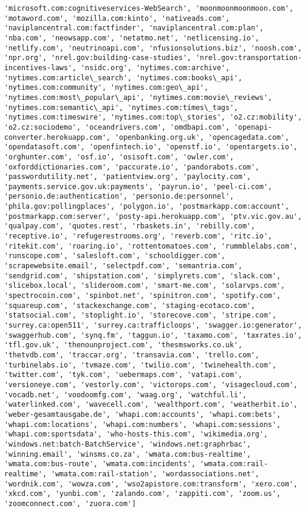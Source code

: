 \documentclass[11pt]{article}
\begin{document}
\begin{Verbatim}[commandchars=\\\{\}]
'microsoft.com:cognitiveservices-WebSearch', 'moonmoonmoonmoon.com', 'motaword.com', 'mozilla.com:kinto', 'nativeads.com', 'naviplancentral.com:factfinder', 'naviplancentral.com:plan', 'nba.com', 'neowsapp.com', 'netatmo.net', 'netlicensing.io', 'netlify.com', 'neutrinoapi.com', 'nfusionsolutions.biz', 'noosh.com', 'npr.org', 'nrel.gov:building-case-studies', 'nrel.gov:transportation-incentives-laws', 'nsidc.org', 'nytimes.com:archive', 'nytimes.com:article\_search', 'nytimes.com:books\_api', 'nytimes.com:community', 'nytimes.com:geo\_api', 'nytimes.com:most\_popular\_api', 'nytimes.com:movie\_reviews', 'nytimes.com:semantic\_api', 'nytimes.com:times\_tags', 'nytimes.com:timeswire', 'nytimes.com:top\_stories', 'o2.cz:mobility', 'o2.cz:sociodemo', 'oceandrivers.com', 'omdbapi.com', 'openapi-converter.herokuapp.com', 'openbanking.org.uk', 'opencagedata.com', 'opendatasoft.com', 'openfintech.io', 'openstf.io', 'opentargets.io', 'orghunter.com', 'osf.io', 'osisoft.com', 'owler.com', 'oxforddictionaries.com', 'paccurate.io', 'pandorabots.com', 'passwordutility.net', 'patientview.org', 'paylocity.com', 'payments.service.gov.uk:payments', 'payrun.io', 'peel-ci.com', 'personio.de:authentication', 'personio.de:personnel', 'phila.gov:pollingplaces', 'polygon.io', 'postmarkapp.com:account', 'postmarkapp.com:server', 'posty-api.herokuapp.com', 'ptv.vic.gov.au', 'qualpay.com', 'quotes.rest', 'rbaskets.in', 'rebilly.com', 'receptive.io', 'refugerestrooms.org', 'reverb.com', 'ritc.io', 'ritekit.com', 'roaring.io', 'rottentomatoes.com', 'rummblelabs.com', 'runscope.com', 'salesloft.com', 'schooldigger.com', 'scrapewebsite.email', 'selectpdf.com', 'semantria.com', 'sendgrid.com', 'shipstation.com', 'simplyrets.com', 'slack.com', 'slicebox.local', 'slideroom.com', 'smart-me.com', 'solarvps.com', 'spectrocoin.com', 'spinbot.net', 'spinitron.com', 'spotify.com', 'squareup.com', 'stackexchange.com', 'staging-ecotaco.com', 'statsocial.com', 'stoplight.io', 'storecove.com', 'stripe.com', 'surrey.ca:open511', 'surrey.ca:trafficloops', 'swagger.io:generator', 'swaggerhub.com', 'synq.fm', 'taggun.io', 'taxamo.com', 'taxrates.io', 'tfl.gov.uk', 'thenounproject.com', 'thesmsworks.co.uk', 'thetvdb.com', 'traccar.org', 'transavia.com', 'trello.com', 'turbinelabs.io', 'tvmaze.com', 'twilio.com', 'twinehealth.com', 'twitter.com', 'tyk.com', 'uebermaps.com', 'vatapi.com', 'versioneye.com', 'vestorly.com', 'victorops.com', 'visagecloud.com', 'vocadb.net', 'voodoomfg.com', 'waag.org', 'watchful.li', 'waterlinked.com', 'wavecell.com', 'wealthport.com', 'weatherbit.io', 'weber-gesamtausgabe.de', 'whapi.com:accounts', 'whapi.com:bets', 'whapi.com:locations', 'whapi.com:numbers', 'whapi.com:sessions', 'whapi.com:sportsdata', 'who-hosts-this.com', 'wikimedia.org', 'windows.net:batch-BatchService', 'windows.net:graphrbac', 'winning.email', 'winsms.co.za', 'wmata.com:bus-realtime', 'wmata.com:bus-route', 'wmata.com:incidents', 'wmata.com:rail-realtime', 'wmata.com:rail-station', 'wordassociations.net', 'wordnik.com', 'wowza.com', 'wso2apistore.com:transform', 'xero.com', 'xkcd.com', 'yunbi.com', 'zalando.com', 'zappiti.com', 'zoom.us', 'zoomconnect.com', 'zuora.com']

    \end{Verbatim}
\end{document}
